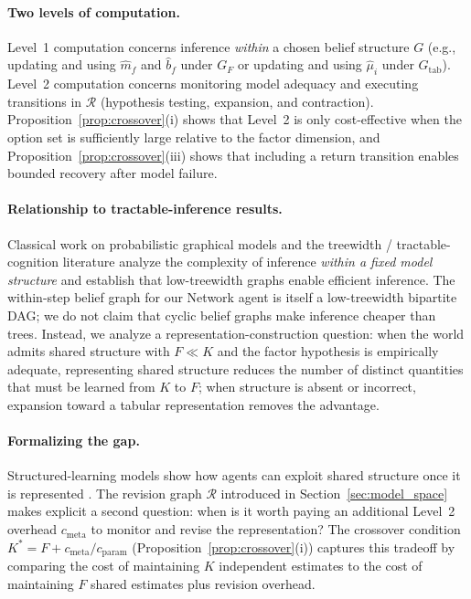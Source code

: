 \documentclass[11pt]{article}
\begin{document}
\paragraph{Two levels of computation.}
Level~1 computation concerns inference \emph{within} a chosen belief structure
$G$ (e.g., updating and using $\widehat{m}_f$ and $\widehat{b}_f$ under $G_F$ or
updating and using $\widehat{\mu}_i$ under $G_{\mathrm{tab}}$).
Level~2 computation concerns monitoring model adequacy and executing transitions
in $\mathcal{R}$ (hypothesis testing, expansion, and contraction).
Proposition~\ref{prop:crossover}(i) shows that Level~2 is only cost-effective
when the option set is sufficiently large relative to the factor dimension, and
Proposition~\ref{prop:crossover}(iii) shows that including a return transition
enables bounded recovery after model failure.

\paragraph{Relationship to tractable-inference results.}
Classical work on probabilistic graphical models \cite{Pearl1988} and the
treewidth / tractable-cognition literature \cite{vanRooij2008,Kwisthout2010}
analyze the complexity of inference \emph{within a fixed model structure} and
establish that low-treewidth graphs enable efficient inference.  The within-step
belief graph for our Network agent is itself a low-treewidth bipartite DAG; we
do not claim that cyclic belief graphs make inference cheaper than trees.
Instead, we analyze a representation-construction question: when the world
admits shared structure with $F\ll K$ and the factor hypothesis is empirically
adequate, representing shared structure reduces the number of distinct
quantities that must be learned from $K$ to $F$; when structure is absent or
incorrect, expansion toward a tabular representation removes the advantage.

\paragraph{Formalizing the gap.}
Structured-learning models show how agents can exploit shared structure once it is
represented \cite{KempTenenbaum2008,CollinsFrank2013}.  The revision graph
$\mathcal{R}$ introduced in Section~\ref{sec:model_space} makes explicit a
second question: when is it worth paying an additional Level~2 overhead
$c_{\mathrm{meta}}$ to monitor and revise the representation?  The crossover
condition $K^* = F + c_{\mathrm{meta}}/c_{\mathrm{param}}$
(Proposition~\ref{prop:crossover}(i)) captures this tradeoff by comparing the
cost of maintaining $K$ independent estimates to the cost of maintaining $F$ shared
estimates plus revision overhead.
\end{document}
